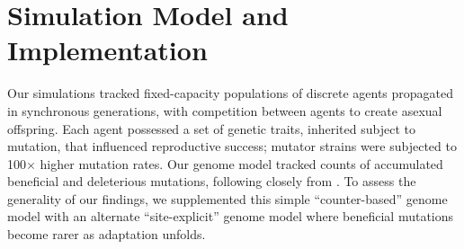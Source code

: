 \section{Simulation Model and Implementation} \label{sec:methods}

Our simulations tracked fixed-capacity populations of discrete agents propagated in synchronous generations, with competition between agents to create asexual offspring.
Each agent possessed a set of genetic traits, inherited subject to mutation, that influenced reproductive success; mutator strains were subjected to 100$\times$ higher mutation rates.
Our genome model tracked counts of accumulated beneficial and deleterious mutations, following closely from \citep{raynes2018sign}.
To assess the generality of our findings, we supplemented this simple ``counter-based'' genome model with an alternate ``site-explicit'' genome model where beneficial mutations become rarer as adaptation unfolds.
%
%
%
